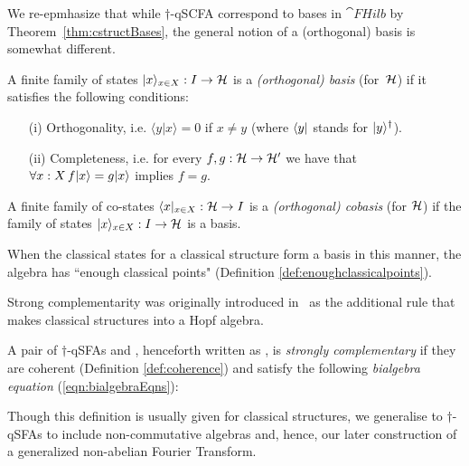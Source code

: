 
We re-epmhasize that while $\dagger$-qSCFA correspond to bases in $\cat{FHilb}$ by Theorem~\ref{thm:cstructBases}, the general notion of a (orthogonal) basis is somewhat different.

\begin{defn}\label{def_basis}
A finite family of states $| x \rangle_{x\in X}: I \rightarrow \mathcal{H}$ is a \emph{(orthogonal) basis} (for~$\mathcal{H}$) if it satisfies the following conditions:
\begin{enumerate}
\item[(i)] Orthogonality, i.e. $\langle y|x\rangle = 0$ if $x \neq y$ (where $\langle y |$ stands for $| y \rangle^\dagger$).
\item[(ii)] Completeness, i.e. for every $f,g : \mathcal{H} \rightarrow \mathcal{H}'$ we have that $\forall x:X \, f | x \rangle = g | x \rangle$ implies $f=g$. 
\end{enumerate}
A finite family of co-states $\langle x |_{x\in X}: \mathcal{H} \rightarrow I$ is a \emph{(orthogonal) cobasis} (for $\mathcal{H}$) if the family of states $| x \rangle_{x\in X}: I \rightarrow \mathcal{H}$ is a basis.
\end{defn}
\noindent When the classical states for a classical structure form a basis in this manner, the algebra has ``enough classical points" (Definition \ref{def:enoughclassicalpoints}).
 
Strong complementarity was originally introduced in~\cite{coecke2011interacting} as the additional rule that makes classical structures into a Hopf algebra.

\begin{defn}\label{def_StrongComplementarity}
A pair of $\dagger$-qSFAs  and , henceforth written as \scpair, is \emph{strongly complementary} if they are coherent (Definition \ref{def:coherence})  and  satisfy the following \emph{bialgebra equation} (\ref{eqn:bialgebraEqns}):
\begin{equation}
\label{eqn:bialgebraEqns}

\end{equation}
\end{defn}
\noindent Though this definition is usually given for classical structures, we generalise to $\dagger$-qSFAs to include non-commutative algebras and, hence, our later construction of a generalized non-abelian Fourier Transform.

